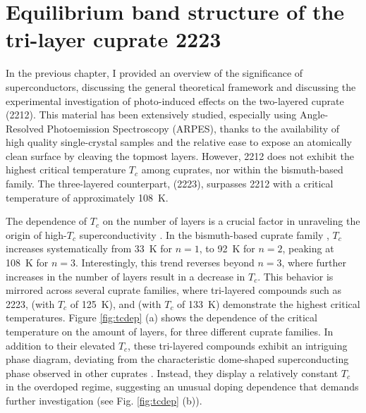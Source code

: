 \renewcommand{\chaptercolor}{custom_yellow}
\chapter{Equilibrium band structure of the tri-layer cuprate 2223}

In the previous chapter, I provided an overview of the significance of superconductors, discussing the general theoretical framework and discussing the experimental investigation of photo-induced effects on the two-layered cuprate  (2212).
This material has been extensively studied, especially using Angle-Resolved Photoemission Spectroscopy (ARPES), thanks to the availability of high quality single-crystal samples and the relative ease to expose an atomically clean surface by cleaving the topmost layers.
However, 2212 does not exhibit the highest critical temperature $T_c$ among cuprates, nor within the bismuth-based family.
The three-layered counterpart,  (2223), surpasses 2212 with a critical temperature of approximately \qty{108}{\kelvin}.

The dependence of $T_c$ on the number of  layers is a crucial factor in unraveling the origin of high-$T_c$ superconductivity \cite{feng_electronic_2002, scott_layer_1994, chakravarty_explanation_2004,iyo_tc_2007,chu_hole-doped_2015,luo_electronic_2023}.
In the bismuth-based cuprate family , $T_c$ increases systematically from \qty{33}{\kelvin} for $n=1$, to \qty{92}{\kelvin} for $n=2$, peaking at \qty{108}{\kelvin} for $n=3$.
Interestingly, this trend reverses beyond $n=3$, where further increases in the number of  layers result in a decrease in $T_c$.
This behavior is mirrored across several cuprate families, where tri-layered compounds such as 2223,  (with $T_c$ of \qty{125}{\kelvin}), and  (with $T_c$ of \qty{133}{\kelvin}) demonstrate the highest critical temperatures.
Figure \ref{fig:tcdep} (a) shows the dependence of the critical temperature on the amount of  layers, for three different cuprate families.
In addition to their elevated $T_c$, these tri-layered compounds exhibit an intriguing phase diagram, deviating from the characteristic dome-shaped superconducting phase observed in other cuprates \cite{fujii_doping_2002,piriou_effect_2008}.
Instead, they display a relatively constant $T_c$ in the overdoped regime, suggesting an unusual doping dependence that demands further investigation (see Fig. \ref{fig:tcdep} (b)).

